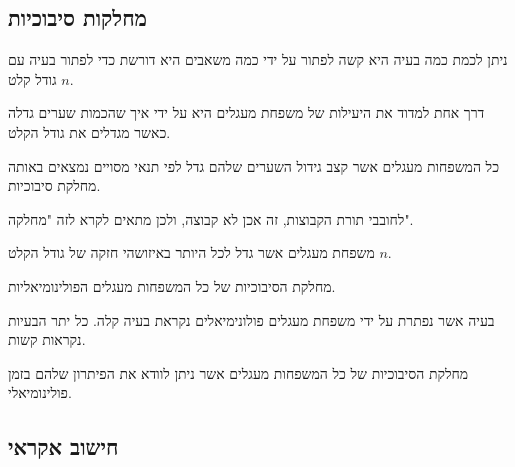 \documentclass{tstextbook}
\begin{document}
\subsection{מחלקות סיבוכיות}

ניתן לכמת כמה בעיה היא קשה לפתור על ידי כמה משאבים היא דורשת כדי לפתור בעיה עם גודל קלט \(n\).

\begin{proposition}
דרך אחת למדוד את היעילות של משפחת מעגלים היא על ידי איך שהכמות שערים גדלה כאשר מגדלים את גודל הקלט. 

\end{proposition}
\begin{definition}
כל המשפחות מעגלים אשר קצב גידול השערים שלהם גדל לפי תנאי מסויים נמצאים באותה מחלקת סיבוכיות.

\end{definition}
\begin{remark}
לחובבי תורת הקבוצות, זה אכן לא קבוצה, ולכן מתאים לקרא לזה "מחלקה".

\end{remark}
\begin{definition}
משפחת מעגלים אשר גדל לכל היותר באיזושהי חזקה של גודל הקלט \(n\).

\end{definition}
\begin{definition}
מחלקת הסיבוכיות של כל המשפחות מעגלים הפולינומיאליות.

\end{definition}
\begin{definition}
בעיה אשר נפתרת על ידי משפחת מעגלים פולונימיאלים נקראת בעיה קלה. כל יתר הבעיות נקראות קשות.

\end{definition}
\begin{definition}
מחלקת הסיבוכיות של כל המשפחות מעגלים אשר ניתן לוודא את הפיתרון שלהם בזמן פולינומיאלי.

\end{definition}
\subsection{חישוב אקראי}
\end{document}
